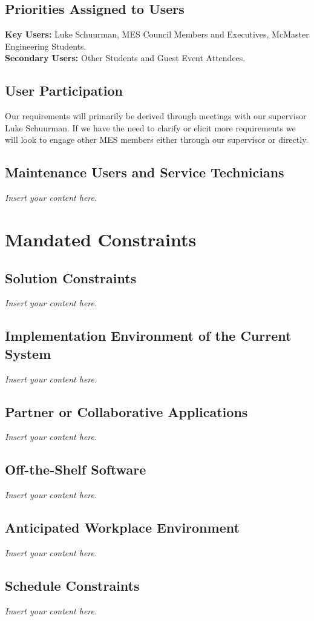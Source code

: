 \documentclass[12pt]{article}
\newcommand{\lips}{\textit{Insert your content here.}}
\begin{document}
\subsection{Priorities Assigned to Users}
\textbf{Key Users:} Luke Schuurman, MES Council Members and Executives, McMaster Engineering Students. \\
\textbf{Secondary Users:} Other Students and Guest Event Attendees.
\subsection{User Participation}
Our requirements will primarily be derived through meetings with our supervisor Luke Schuurman. If we have the need to clarify or elicit more requirements we will look to engage other MES members either through our supervisor or directly.

\subsection{Maintenance Users and Service Technicians}
\lips

\section{Mandated Constraints}
\subsection{Solution Constraints}
\lips
\subsection{Implementation Environment of the Current System}
\lips
\subsection{Partner or Collaborative Applications}
\lips
\subsection{Off-the-Shelf Software}
\lips
\subsection{Anticipated Workplace Environment}
\lips
\subsection{Schedule Constraints}
\lips
\end{document}
